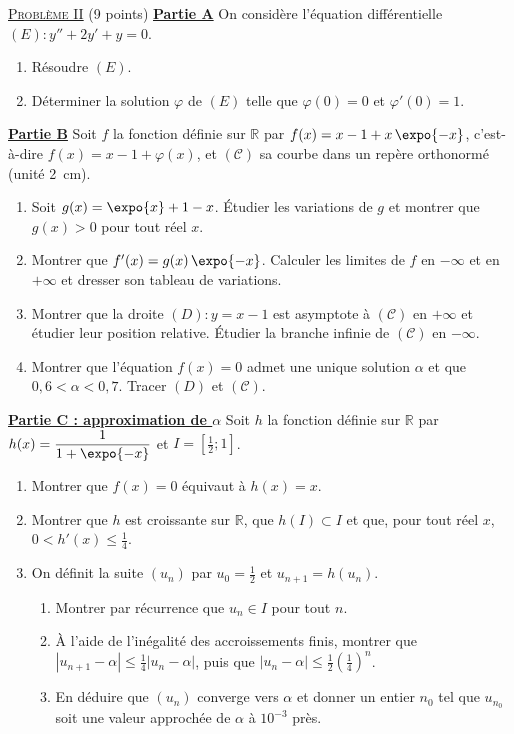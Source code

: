 \noindent \underline{\textsc{Probl\`eme II}} (9 points) \newline
\underline{\textbf{Partie A}} \newline
On consid\`ere l'\'equation diff\'erentielle $(E) : y'' + 2y' + y = 0$.
\begin{enumerate}
      \item R\'esoudre $(E)$.
      \item D\'eterminer la solution $\varphi$ de $(E)$ telle que $\varphi(0) = 0$ et $\varphi'(0) = 1$.
\end{enumerate}
\underline{\textbf{Partie B}} \newline
Soit $f$ la fonction d\'efinie sur $\mathbb{R}$ par $f(x) = x - 1 + x\,\expo{-x}$, c'est-\`a-dire $f(x) = x - 1 + \varphi(x)$,
et $(\mathscr{C})$ sa courbe dans un rep\`ere orthonorm\'e (unit\'e 2~cm).
\begin{enumerate}
      \item Soit $g(x) = \expo{x} + 1 - x$. \'Etudier les variations de $g$ et montrer que $g(x) > 0$ pour tout r\'eel $x$.
      \item Montrer que $f'(x) = g(x)\,\expo{-x}$. Calculer les limites de $f$ en $-\infty$ et en $+\infty$ et dresser son tableau de variations.
      \item Montrer que la droite $(D) : y = x - 1$ est asymptote \`a $(\mathscr{C})$ en $+\infty$ et \'etudier leur position relative.
            \'Etudier la branche infinie de $(\mathscr{C})$ en $-\infty$.
      \item Montrer que l'\'equation $f(x) = 0$ admet une unique solution $\alpha$ et que $0{,}6 < \alpha < 0{,}7$. Tracer $(D)$ et $(\mathscr{C})$.
\end{enumerate}
\underline{\textbf{Partie C : approximation de $\alpha$}} \newline
Soit $h$ la fonction d\'efinie sur $\mathbb{R}$ par $h(x) = \dfrac{1}{1 + \expo{-x}}$ et $I = \left[\frac{1}{2} ; 1\right]$.
\begin{enumerate}
      \item Montrer que $f(x) = 0$ \'equivaut \`a $h(x) = x$.
      \item Montrer que $h$ est croissante sur $\mathbb{R}$, que $h(I) \subset I$ et que, pour tout r\'eel $x$, $0 < h'(x) \leq \frac{1}{4}$.
      \item On d\'efinit la suite $(u_n)$ par $u_0 = \frac{1}{2}$ et $u_{n+1} = h(u_n)$.
            \begin{enumerate}
            \item Montrer par r\'ecurrence que $u_n \in I$ pour tout $n$.
            \item \`A l'aide de l'in\'egalit\'e des accroissements finis, montrer que $|u_{n+1} - \alpha| \leq \frac{1}{4}|u_n - \alpha|$,
                  puis que $|u_n - \alpha| \leq \frac{1}{2}\left(\frac{1}{4}\right)^n$.
            \item En d\'eduire que $(u_n)$ converge vers $\alpha$ et donner un entier $n_0$ tel que $u_{n_0}$ soit une valeur
                  approch\'ee de $\alpha$ \`a $10^{-3}$ pr\`es.
            \end{enumerate}
\end{enumerate}
